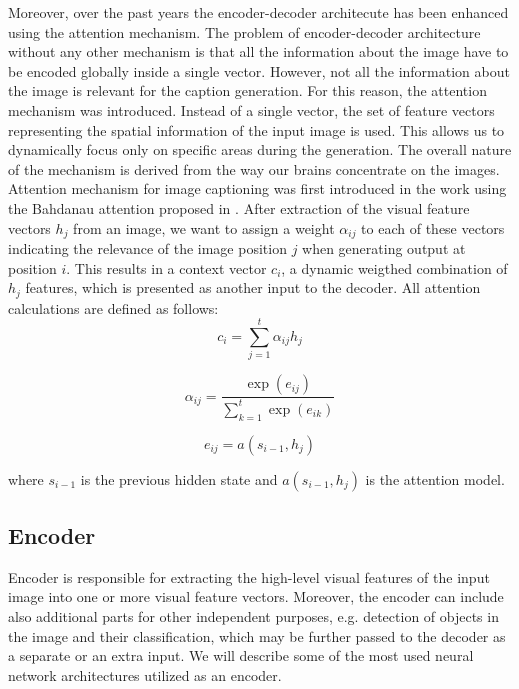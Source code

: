 Moreover, over the past years the encoder-decoder architecute has been enhanced using the attention mechanism. The problem of encoder-decoder architecture without any other mechanism is that all the information about the image have to be encoded globally inside a single vector. However, not all the information about the image is relevant for the caption generation. For this reason, the attention mechanism was introduced. Instead of a single vector, the set of feature vectors representing the spatial information of the input image is used. This allows us to dynamically focus only on specific areas during the generation. The overall nature of the mechanism is derived from the way our brains concentrate on the images.\\

Attention mechanism for image captioning was first introduced in the \citet{xu2015show} work using the Bahdanau attention proposed in \citet{bahdanau2014neural}. After extraction of the visual feature vectors $h_j$ from an image, we want to assign a weight $\alpha_{ij}$ to each of these vectors indicating the relevance of the image position $j$ when generating output at position $i$. This results in a context vector $c_i$, a dynamic weigthed combination of $h_j$ features, which is presented as another input to the decoder. All attention calculations are defined as follows:
\begin{equation}\label{eq01:AttContext}
	c_i = \sum_{j=1}^{t} \alpha_{ij} h_j
\end{equation}

\begin{equation}\label{eq01:AttWeights}
	\alpha_{ij} = \frac{\exp(e_{ij})}{\sum_{k=1}^{t} \exp(e_{ik})}
\end{equation}

\begin{equation}\label{eq01:AttFeedForwardNetwork}
	e_{ij} = a(s_{i-1}, h_j)
\end{equation}

where $s_{i-1}$ is the previous hidden state and $a(s_{i-1}, h_j)$ is the attention model.

\subsection{Encoder}
Encoder is responsible for extracting the high-level visual features of the input image into one or more visual feature vectors. Moreover, the encoder can include also additional parts for other independent purposes, e.g. detection of objects in the image and their classification, which may be further passed to the decoder as a separate or an extra input. We will describe some of the most used neural network architectures utilized as an encoder.

